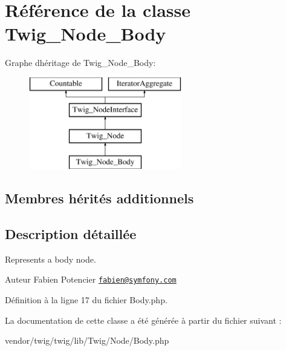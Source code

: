 \hypertarget{class_twig___node___body}{}\section{Référence de la classe Twig\+\_\+\+Node\+\_\+\+Body}
\label{class_twig___node___body}
Graphe d\textquotesingle{}héritage de Twig\+\_\+\+Node\+\_\+\+Body\+:\begin{figure}[H]
\begin{center}
\leavevmode
\includegraphics[height=4.000000cm]{class_twig___node___body}
\end{center}
\end{figure}
\subsection*{Membres hérités additionnels}


\subsection{Description détaillée}
Represents a body node.

\begin{DoxyAuthor}{Auteur}
Fabien Potencier \href{mailto:fabien@symfony.com}{\tt fabien@symfony.\+com} 
\end{DoxyAuthor}


Définition à la ligne 17 du fichier Body.\+php.



La documentation de cette classe a été générée à partir du fichier suivant \+:\begin{DoxyCompactItemize}
\item 
vendor/twig/twig/lib/\+Twig/\+Node/Body.\+php\end{DoxyCompactItemize}
